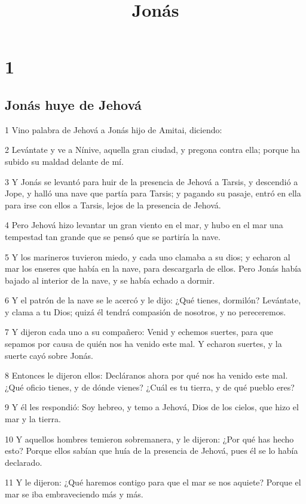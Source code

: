 

\title{Jonás}

\chapter{1}

\section*{Jonás huye de Jehová}

\par 1 Vino palabra de Jehová a Jonás hijo de Amitai, diciendo:
\par 2 Levántate y ve a Nínive, aquella gran ciudad, y pregona contra ella; porque ha subido su maldad delante de mí.
\par 3 Y Jonás se levantó para huir de la presencia de Jehová a Tarsis, y descendió a Jope, y halló una nave que partía para Tarsis; y pagando su pasaje, entró en ella para irse con ellos a Tarsis, lejos de la presencia de Jehová.
\par 4 Pero Jehová hizo levantar un gran viento en el mar, y hubo en el mar una tempestad tan grande que se pensó que se partiría la nave.
\par 5 Y los marineros tuvieron miedo, y cada uno clamaba a su dios; y echaron al mar los enseres que había en la nave, para descargarla de ellos. Pero Jonás había bajado al interior de la nave, y se había echado a dormir.
\par 6 Y el patrón de la nave se le acercó y le dijo: ¿Qué tienes, dormilón? Levántate, y clama a tu Dios; quizá él tendrá compasión de nosotros, y no pereceremos.
\par 7 Y dijeron cada uno a su compañero: Venid y echemos suertes, para que sepamos por causa de quién nos ha venido este mal. Y echaron suertes, y la suerte cayó sobre Jonás.
\par 8 Entonces le dijeron ellos: Decláranos ahora por qué nos ha venido este mal. ¿Qué oficio tienes, y de dónde vienes? ¿Cuál es tu tierra, y de qué pueblo eres?
\par 9 Y él les respondió: Soy hebreo, y temo a Jehová, Dios de los cielos, que hizo el mar y la tierra.
\par 10 Y aquellos hombres temieron sobremanera, y le dijeron: ¿Por qué has hecho esto? Porque ellos sabían que huía de la presencia de Jehová, pues él se lo había declarado.
\par 11 Y le dijeron: ¿Qué haremos contigo para que el mar se nos aquiete? Porque el mar se iba embraveciendo más y más.
